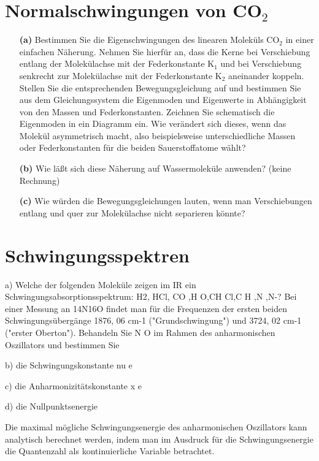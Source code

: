 \section{Normalschwingungen von CO$_2$}

\begin{itemize}

\item[\textbf{(a)}] Bestimmen Sie die Eigenschwingungen des linearen Moleküls CO$_2$ in einer einfachen Näherung. Nehmen Sie hierfür an, dass die Kerne bei Verschiebung entlang der Molekülachse mit der Federkonstante K$_1$ und bei Verschiebung senkrecht zur Molekülachse mit der Federkonstante K$_2$ aneinander koppeln. Stellen Sie die entsprechenden Bewegungsgleichung auf und bestimmen Sie aus dem Gleichungssystem die Eigenmoden und Eigenwerte in Abhängigkeit von den Massen und Federkonstanten. Zeichnen Sie schematisch die Eigenmoden in ein Diagramm ein. Wie verändert sich dieses, wenn das Molekül asymmetrisch macht, also beispielsweise unterschiedliche Massen oder Federkonstanten für die beiden Sauerstoffatome wählt?

\item[\textbf{(b)}] Wie läßt sich diese Näherung auf Wassermoleküle anwenden? (keine Rechnung)

\item[\textbf{(c)}] Wie würden die Bewegungsgleichungen lauten, wenn man Verschiebungen entlang und quer zur Molekülachse nicht separieren könnte? 


\end{itemize}



\section{Schwingungsspektren}

a) Welche der folgenden Moleküle zeigen im IR ein Schwingungsabsorptionsspektrum: H2, HCl, CO ,H O,CH Cl,C H ,N ,N-?
Bei einer Messung an 14N16O findet man für die Frequenzen der ersten beiden Schwingungsübergänge 1876, 06 cm-1 ("Grundschwingung") und 3724, 02 cm-1 ("erster Oberton"). Behandeln Sie N O im Rahmen des anharmonischen Oszillators und bestimmen Sie

b) die Schwingungskonstante nu e

c) die Anharmonizitätskonstante x e

d) die Nullpunktsenergie

Die maximal mögliche Schwingungsenergie des anharmonischen Oszillators kann analytisch berechnet werden, indem man im Ausdruck für die Schwingungsenergie die Quantenzahl als kontinuierliche Variable betrachtet.

